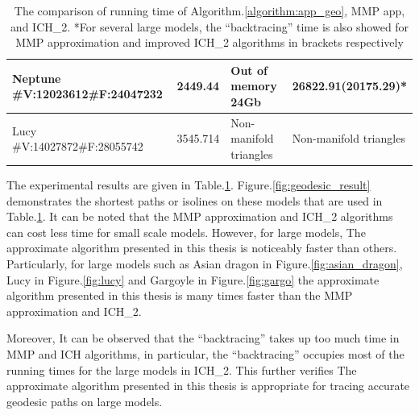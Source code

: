 \begin{table}[H]
\begin{tabular}{|p{3.5cm}|p{2cm}|p{2.5cm}|p{2.5cm}|}
        \hline
        Neptune \#V:12023612\newline\#F:24047232 & 2449.44 & Out of memory 24Gb & 26822.91\newline(20175.29)* \\
        \hline
        Lucy \#V:14027872\newline\#F:28055742 & 3545.714 & Non-manifold triangles & Non-manifold triangles \\
        \hline
    \end{tabular}
    \caption[The comparison of running of presented algorithms]{The comparison of running time of Algorithm.\ref{algorithm:app_geo}, MMP app, and ICH\_2. *For several large models, the ``backtracing'' time is also showed for MMP approximation and improved ICH\_2 algorithms in brackets respectively}
    \label{table:tab_3}
\end{table}
\setlength{\tabcolsep}{6pt}
\renewcommand{\arraystretch}{1}%
\renewcommand{\baselinestretch}{1.5}

The experimental results are given in Table.\ref{table:tab_3}. Figure.\ref{fig:geodesic_result} demonstrates the shortest paths or isolines on these models that are used in Table.\ref{table:tab_3}. It can be noted that the MMP approximation and ICH\_2 algorithms can cost less time for small scale models. However, for large models, The approximate algorithm presented in this thesis is noticeably faster than others. Particularly, for large models such as Asian dragon in Figure.\ref{fig:asian_dragon}, Lucy in Figure.\ref{fig:lucy} and Gargoyle in Figure.\ref{fig:gargo} the approximate algorithm presented in this thesis is many times faster than the MMP approximation and ICH\_2. 

Moreover, It can be observed that the ``backtracing'' takes up too much time in MMP and ICH algorithms, in particular, the ``backtracing'' occupies most of the running times for the large models in ICH\_2. This further verifies The approximate algorithm presented in this thesis is appropriate for tracing accurate geodesic paths on large models.